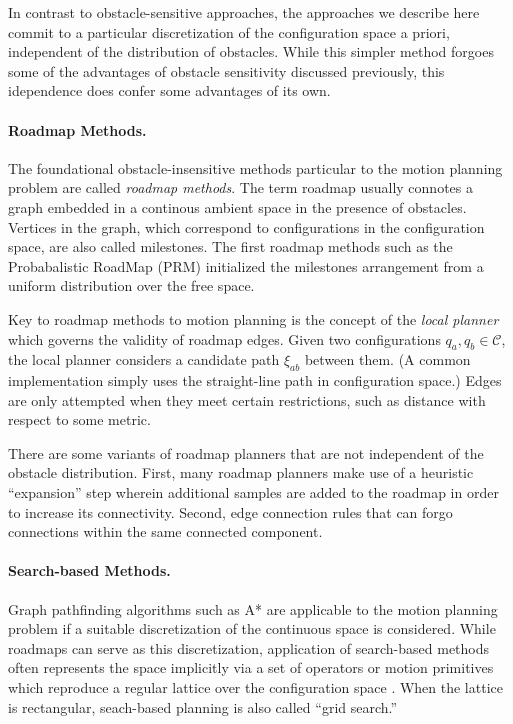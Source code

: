 In contrast to obstacle-sensitive approaches,
the approaches we describe here
commit to a particular discretization
of the configuration space a priori,
independent of the distribution of obstacles.
While this simpler method forgoes some of the advantages of
obstacle sensitivity discussed previously,
this idependence does confer some advantages of its own.

\paragraph{Roadmap Methods.}

The foundational obstacle-insensitive methods particular to the motion
planning problem are called \emph{roadmap methods}.
The term roadmap usually connotes a graph embedded in a continous
ambient space in the presence of obstacles.
Vertices in the graph,
which correspond to configurations in the configuration space,
are also called milestones.
The first roadmap methods such as the
Probabalistic RoadMap (PRM) \citep{kavrakietal1996prm}
initialized the milestones arrangement
from a uniform distribution over the free space.

Key to roadmap methods to motion planning
is the concept of the \emph{local planner}
which governs the validity of roadmap edges.
Given two configurations $q_a, q_b \in \mathcal{C}$,
the local planner considers a candidate path $\xi_{ab}$ between
them.
(A common implementation simply uses the straight-line path
in configuration space.)
Edges are only attempted when they meet certain restrictions,
such as distance with respect to some metric.

There are some variants of roadmap planners that are not independent
of the obstacle distribution.
First,
many roadmap planners make use of a heuristic ``expansion'' step
wherein additional samples are added to the roadmap
in order to increase its connectivity.
Second,
edge connection rules that can forgo connections within
the same connected component.


\paragraph{Search-based Methods.}
Graph pathfinding algorithms such as A* \citep{hart1968astar}
are applicable to the motion planning problem if a suitable
discretization of the continuous space is considered.
While roadmaps can serve as this discretization,
application of search-based methods often represents the space
implicitly via a set of operators or motion primitives
which reproduce a regular lattice over the configuration space
\citep{pivtoraiko2005statelattice}.
When the lattice is rectangular,
seach-based planning is also called ``grid search.''

